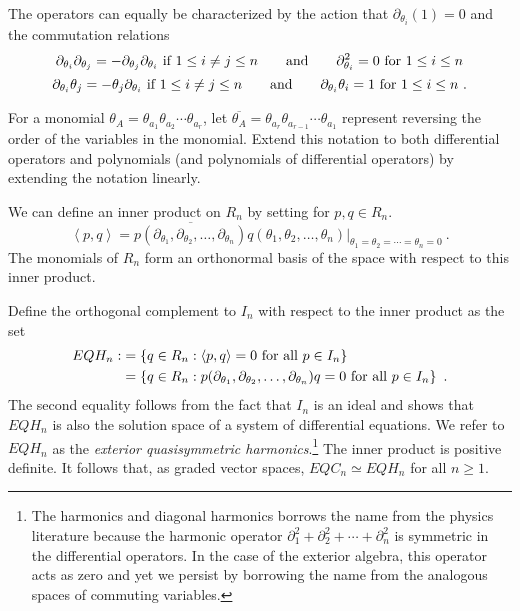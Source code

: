 \documentclass[submission]{FPSAC2023}
\theoremstyle{definition}
\numberwithin{equation}{section}
\begin{document}
The operators can equally be characterized by the action that $\partial_{\theta_i}(1) = 0$
and the commutation relations
\[
\partial_{\theta_i} \partial_{\theta_j}=-\partial_{\theta_j} \partial_{\theta_i}
\hbox{ if } 1 \leq i \neq j \leq n
\qquad\hbox{and}\qquad
\partial_{\theta_i}^2 = 0\hbox{ for }1 \leq i \leq n
\]
\[
\partial_{\theta_i} \theta_j=-\theta_j \partial_{\theta_i}
\hbox{ if } 1 \leq i \neq j \leq n
\qquad\hbox{and}\qquad
\partial_{\theta_i} \theta_i = 1\hbox{ for }1 \leq i \leq n~.
\]

For a monomial $\theta_A = \theta_{a_1} \theta_{a_2} \cdots \theta_{a_r}$,
let $\overline{\theta_A} = \theta_{a_r} \theta_{a_{r-1}} \cdots \theta_{a_1}$ represent
reversing the order of the variables in the monomial.  Extend this notation to both
differential operators and polynomials (and polynomials of differential operators)
by extending the notation linearly.

We can define an inner product on $R_n$ by setting for $p,q \in R_n$.
\[
\left< p, q \right> = \overline{p(\partial_{\theta_1}, \partial_{\theta_2}, \ldots, \partial_{\theta_n})}
q( \theta_1, \theta_2, \ldots, \theta_n)|_{\theta_1=\theta_2 = \cdots=\theta_n=0}~.
\]
The monomials of $R_n$ form an orthonormal basis of the space with respect to this
inner product.

Define the orthogonal complement to $I_n$ with respect to the inner product as
the set
\begin{align}
EQH_n :&= \left\{ q \in R_n : \left< p, q \right> = 0 \hbox{ for all } p \in I_n \right\}
\label{eq:set1}\\
  &=\left\{ q \in R_n : p(\partial_{\theta_1}, \partial_{\theta_2}, \ldots, \partial_{\theta_n})
q= 0 \hbox{ for all } p \in I_n \right\}~.\label{eq:diffeqs}
\end{align}
The second equality follows from the fact that $I_n$ is an ideal
and shows that $EQH_n$ is also the solution space of
a system of differential equations.  
We refer to $EQH_n$ as the \emph{exterior quasisymmetric harmonics}.\footnote{
The harmonics and diagonal harmonics borrows the name from the physics literature
because the harmonic operator $\partial_1^2 + \partial_2^2 + \cdots + \partial_n^2$
is symmetric in the differential operators.  In the case of the exterior algebra,
this operator acts as zero and yet we persist by borrowing the name from the
analogous spaces of commuting variables.
} 
The inner product is positive definite. It follows that, as graded vector spaces, $
EQC_n \simeq EQH_n$ for all $n \ge 1$.
\end{document}
